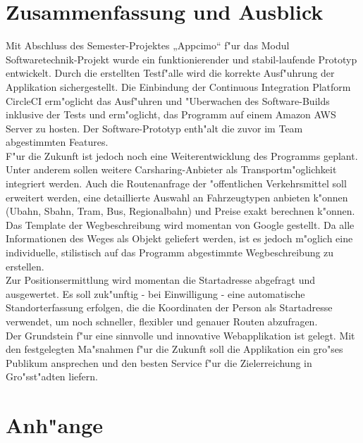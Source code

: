 \documentclass[a4paper, 11pt]{scrreprt}
\begin{document}
\chapter{Zusammenfassung und Ausblick}
Mit Abschluss des Semester-Projektes „Appcimo“ f"ur das Modul Softwaretechnik-Projekt wurde ein funktionierender und stabil-laufende Prototyp entwickelt. Durch die erstellten Testf"alle wird die korrekte Ausf"uhrung der Applikation sichergestellt. Die Einbindung der Continuous Integration Platform CircleCI erm"oglicht das Ausf"uhren und "Uberwachen des Software-Builds inklusive der Tests und erm"oglicht, das Programm auf einem Amazon AWS Server zu hosten. Der Software-Prototyp enth"alt die zuvor im Team abgestimmten Features.\\
F"ur die Zukunft ist jedoch noch eine Weiterentwicklung des Programms geplant. Unter anderem sollen weitere Carsharing-Anbieter als Transportm"oglichkeit integriert werden. Auch die Routenanfrage der "offentlichen Verkehrsmittel soll erweitert werden, eine detaillierte Auswahl an Fahrzeugtypen anbieten k"onnen (Ubahn, Sbahn, Tram, Bus, Regionalbahn) und Preise exakt berechnen k"onnen. \\

Das Template der Wegbeschreibung wird momentan von Google gestellt. Da alle Informationen des Weges als Objekt geliefert werden, ist es jedoch m"oglich eine individuelle, stilistisch auf das Programm abgestimmte Wegbeschreibung zu erstellen. \\

Zur Positionsermittlung wird momentan die Startadresse abgefragt und ausgewertet. Es soll zuk"unftig - bei Einwilligung - eine automatische Standorterfassung erfolgen, die die Koordinaten der Person als Startadresse verwendet, um noch schneller, flexibler und genauer Routen abzufragen.\\

Der Grundstein f"ur eine sinnvolle und innovative Webapplikation ist gelegt. Mit den festgelegten Ma"snahmen f"ur die Zukunft soll die Applikation ein gro"ses Publikum ansprechen und den besten Service f"ur die Zielerreichung in Gro"sst"adten liefern.\\


\chapter{Anh"ange}

\begingroup
	\renewcommand*{\addvspace}[1]{}
	\listoffigures
	\newpage
	\listoftables
\endgroup
\end{document}
